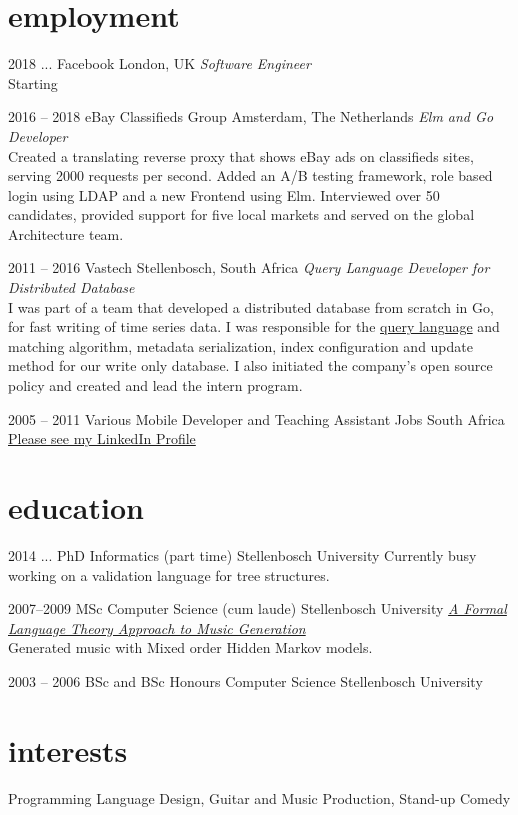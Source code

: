 \documentclass[print]{friggeri-cv-a4} %
\begin{document}
\section{employment}
\begin{entrylist}

\entry
{2018 ...}
{Facebook}
{London, UK}
{\emph{Software Engineer} \\
Starting
}

\entry
{2016 -- 2018}
{eBay Classifieds Group}
{Amsterdam, The Netherlands}
{\emph{Elm and Go Developer} \\
Created a translating reverse proxy that shows eBay ads on classifieds sites, serving 2000 requests per second. Added an A/B testing framework, role based login using LDAP and a new Frontend using Elm. Interviewed over 50 candidates, provided support for five local markets and served on the global Architecture team.
}

\entry
{2011 -- 2016}
{Vastech}
{Stellenbosch, South Africa}
{\emph{Query Language Developer for Distributed Database} \\
I was part of a team that developed a distributed database from scratch in Go, for fast writing of time series data. I was responsible for the \href{https://github.com/katydid/katydid}{query language} and matching algorithm, metadata serialization, index configuration and update method for our write only database. I also initiated the company's open source policy and created and lead the intern program.
}

\entry
{2005 -- 2011}
{Various Mobile Developer and Teaching Assistant Jobs}
{South Africa}
{\href{https://za.linkedin.com/in/schulzewalter}{Please see my LinkedIn Profile}}

\end{entrylist}

\section{education}

\begin{entrylist}

\entry
{2014 ...}
{PhD {\normalfont Informatics} (part time)}
{Stellenbosch University}
{Currently busy working on a validation language for tree structures.}

\entry
{2007--2009}
{MSc {\normalfont Computer Science} (cum laude)}
{Stellenbosch University}
{\href{http://superwillow.sourceforge.net/}{\emph{A Formal Language Theory Approach to Music Generation}} \\ Generated music with Mixed order Hidden Markov models.}

\entry
{2003 -- 2006}
{BSc and BSc Honours {\normalfont Computer Science}}
{Stellenbosch University}
{}

\end{entrylist}

\section{interests}

Programming Language Design, Guitar and Music Production, Stand-up Comedy
\end{document}
